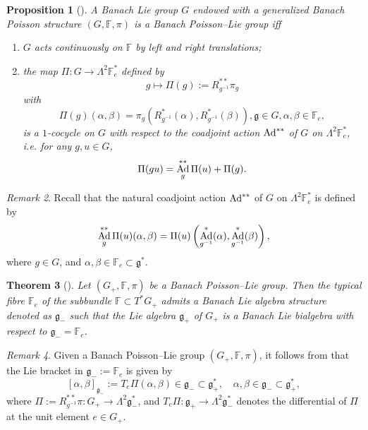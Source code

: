 \documentclass[a4paper,12pt,reqno]{amsart}%
\newtheorem{theorem}{Theorem}
\newtheorem{proposition}[theorem]{Proposition}
\theoremstyle{definition}
\theoremstyle{remark}
\newtheorem{remark}[theorem]{Remark}
\numberwithin{theorem}{section}
\numberwithin{equation}{section}
\newcommand{\1}{{\bf 1}}
\DeclareMathOperator{\Ad}{\textnormal{Ad}}
\newcommand{\g}{{\mathfrak g}}
\begin{document}
\begin{proposition}[{\cite[Proposition~5.7]{tumpach-bruhat}}]\label{cela}
A Banach Lie group $G$ endowed with a generalized Banach Poisson structure $(G, \mathbb{F}, \pi)$  is a Banach Poisson--Lie group iff 
\begin{enumerate}
\item $G$ acts continuously on $\mathbb{F}$ by left and right translations;

\item  the map $\Pi: G  \rightarrow  \Lambda^2\mathbb{F}_e^*$ defined by \[ g \mapsto  \Pi(g) := R_{g^{-1}}^{**}\pi_g\]
with
\[
\Pi(g)\left(\alpha, \beta\right) = \pi_g\left(R_{g^{-1}}^*(\alpha), R_{g^{-1}}^*(\beta)\right), \g\in G, \alpha, \beta \in \mathbb{F}_e,
\]
is a $1$-cocycle on $G$ with respect to the coadjoint action $\Ad^{**}$ of $G$ on $\Lambda^2\mathbb{F}_e^*$, i.e.  for any $g, u\in G$,
\begin{equation}\label{pirPoisson}\Pi(gu)  = \Ad_g^{**}\Pi(u) + \Pi(g).\end{equation}
\end{enumerate}
\end{proposition}

\begin{remark}
 Recall that the natural  coadjoint action $\Ad^{**}$ of $G$ on $\Lambda^2\mathbb{F}_e^*$ is defined by
\[
 \Ad_g^{**}\Pi(u)(\alpha, \beta) = \Pi(u)\left(\Ad^*_{g^{-1}}(\alpha), \Ad^*_{g^{-1}}(\beta)\right),
 \]   
 where $g\in G$, and $\alpha,\beta\in \mathbb{F}_e\subset \g^*$.
\end{remark}

\begin{theorem}[{\cite[Theorem~5.11]{tumpach-bruhat}}] \label{PL_bi}
Let $(G_+, \mathbb{F}, \pi)$ be  a Banach Poisson--Lie group. Then the typical fibre $\mathbb F_e$ of the subbundle $\mathbb{F}\subset T^*G_+$ admits a Banach Lie algebra structure denoted as $\g_-$ such that the Lie algebra $\mathfrak{g}_+$ of $G_+$ is a Banach Lie bialgebra with respect to $\mathfrak{g}_-= \mathbb{F}_e$.
\end{theorem}

\begin{remark}
    Given a Banach Poisson--Lie group $(G_+, \mathbb{F}, \pi)$, it follows from \cite[Theorem~5.11]{tumpach-bruhat} that the Lie bracket in $\mathfrak{g}_-:=\mathbb{F}_e$ is given by 
\begin{equation}\label{def_bracket}
[\alpha, \beta]_{\mathfrak{g}_-} := T_e\Pi(\alpha, \beta)\in \mathfrak{g}_-\subset \mathfrak{g}_+^*,\quad  \alpha, \beta \in \mathfrak{g}_-\subset \mathfrak{g}_+^*, 
\end{equation}
where $\Pi:= R_{g^{-1}}^{**}\pi: G_+ \rightarrow \Lambda^2\mathfrak{g}_-^*$, and  $T_e\Pi :\mathfrak{g}_+\rightarrow \Lambda^2\mathfrak{g}_-^*$ denotes the differential of $\Pi$ at the unit element $e\in G_+$.
\end{remark}
\end{document}
